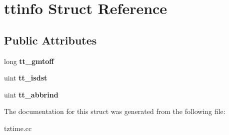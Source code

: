 \hypertarget{structttinfo}{}\section{ttinfo Struct Reference}
\label{structttinfo}
\subsection*{Public Attributes}
\begin{DoxyCompactItemize}
\item 
\mbox{\label{structttinfo_a869a6093ba9fb085b8c0f11e3db7db74}} 
long {\bfseries tt\+\_\+gmtoff}
\item 
\mbox{\label{structttinfo_a71e0ee95894357dac8ba36995df79c8f}} 
uint {\bfseries tt\+\_\+isdst}
\item 
\mbox{\label{structttinfo_ae683be659c98aaec474d60275f245221}} 
uint {\bfseries tt\+\_\+abbrind}
\end{DoxyCompactItemize}


The documentation for this struct was generated from the following file\+:\begin{DoxyCompactItemize}
\item 
tztime.\+cc\end{DoxyCompactItemize}
